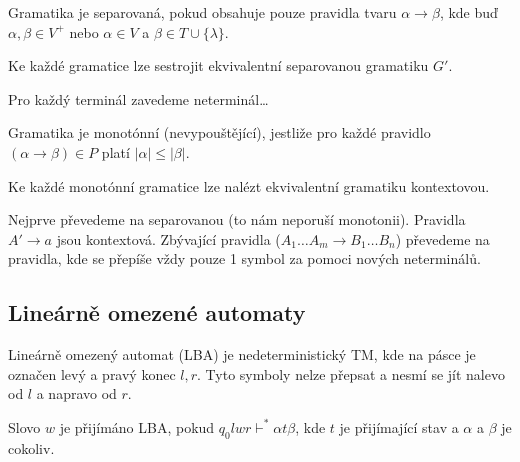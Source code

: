 \documentclass[12pt]{article}                   %
\begin{document}
    \begin{definice}
        Gramatika je separovaná, pokud obsahuje pouze pravidla tvaru $\alpha \rightarrow \beta$, kde buď $\alpha, \beta \in V^+$ nebo $\alpha \in V$ a $\beta \in T \cup \{\lambda\}$.
    \end{definice}

    \begin{lemma}
        Ke každé gramatice lze sestrojit ekvivalentní separovanou gramatiku $G'$.

        \begin{dukazin}
            Pro každý terminál zavedeme neterminál…
        \end{dukazin}
    \end{lemma}

    \begin{definice}
            Gramatika je monotónní (nevypouštějící), jestliže pro každé pravidlo $(\alpha \rightarrow \beta) \in P$ platí $|\alpha| ≤ |\beta|$.
    \end{definice}

    \begin{lemma}
        Ke každé monotónní gramatice lze nalézt ekvivalentní gramatiku kontextovou.

        \begin{dukazin}
            Nejprve převedeme na separovanou (to nám neporuší monotonii). Pravidla $A' \rightarrow a$ jsou kontextová. Zbývající pravidla ($A_1…A_m \rightarrow B_1…B_n$) převedeme na pravidla, kde se přepíše vždy pouze 1 symbol za pomoci nových neterminálů.
        \end{dukazin}
    \end{lemma}

    \subsection{Lineárně omezené automaty}
        \begin{definice}
            Lineárně omezený automat (LBA) je nedeterministický TM, kde na pásce je označen levý a pravý konec $l, r$. Tyto symboly nelze přepsat a nesmí se jít nalevo od $l$ a napravo od $r$.

            Slovo $w$ je přijímáno LBA, pokud $q_0lwr \vdash^* \alpha t \beta$, kde $t$ je přijímající stav a $\alpha$ a $\beta$ je cokoliv.
        \end{definice}
\end{document}

